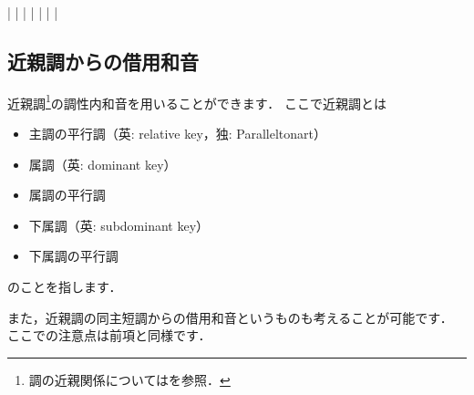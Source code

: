 \documentclass[dvipdfmx,uplatex,b5paper,openany,jbase=12Q,nomag*,textwidth-limit=44%
               ]{gachimuchi}[2020/05/05]
\begin{document}

\begin{Music}
  \generalmeter{\meterC}%
  \Startpiece%
  \NOTes%
  |%
  \en%
  \NOTes%
  |%
  \en\bar%
  \NOTes%
  |%
  \en%
  \NOTes%
  |%
  \en\bar%
  \NOTEs%
  |%
  \en\setdoublebar%
  \endpiece{}%
\end{Music}


\subsection{近親調からの借用和音}
近親調\footnote{調の近親関係についてはを参照．}の調性内和音を用いることができます．
ここで近親調とは
\begin{itemize}
  \item 主調の平行調（英: relative key，独: Paralleltonart）
  \item 属調（英: dominant key）
  \item 属調の平行調
  \item 下属調（英: subdominant key）
  \item 下属調の平行調
\end{itemize}
のことを指します．


また，近親調の同主短調からの借用和音というものも考えることが可能です．
ここでの注意点は前項と同様です．
\end{document}
